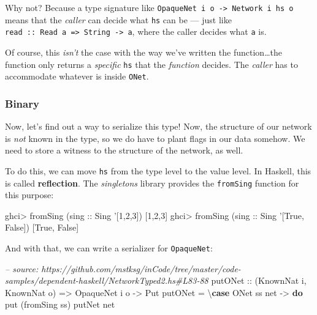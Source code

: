 \documentclass[]{article}
\newenvironment{Shaded}{}{}
\newcommand{\KeywordTok}[1]{\textcolor[rgb]{0.00,0.44,0.13}{\textbf{{#1}}}}
\newcommand{\DataTypeTok}[1]{\textcolor[rgb]{0.56,0.13,0.00}{{#1}}}
\newcommand{\DecValTok}[1]{\textcolor[rgb]{0.25,0.63,0.44}{{#1}}}
\newcommand{\CharTok}[1]{\textcolor[rgb]{0.25,0.44,0.63}{{#1}}}
\newcommand{\CommentTok}[1]{\textcolor[rgb]{0.38,0.63,0.69}{\textit{{#1}}}}
\newcommand{\OtherTok}[1]{\textcolor[rgb]{0.00,0.44,0.13}{{#1}}}
\newcommand{\FunctionTok}[1]{\textcolor[rgb]{0.02,0.16,0.49}{{#1}}}
\newcommand{\NormalTok}[1]{{#1}}
\begin{document}
Why not? Because a type signature like
\texttt{OpaqueNet\ i\ o\ -\textgreater{}\ Network\ i\ hs\ o} means that the
\emph{caller} can decide what \texttt{hs} can be --- just like
\texttt{read\ ::\ Read\ a\ =\textgreater{}\ String\ -\textgreater{}\ a}, where
the caller decides what \texttt{a} is.

Of course, this \emph{isn't} the case with the way we've written the
function\ldots{}the function only returns a \emph{specific} \texttt{hs} that the
\emph{function} decides. The \emph{caller} has to accommodate whatever is inside
\texttt{ONet}.

\subsubsection{Binary}\label{binary}

Now, let's find out a way to serialize this type! Now, the structure of our
network is \emph{not} known in the type, so we do have to plant flags in our
data somehow. We need to store a witness to the structure of the network, as
well.

To do this, we can move \texttt{hs} from the type level to the value level. In
Haskell, this is called \textbf{reflection}. The \emph{singletons} library
provides the \texttt{fromSing} function for this purpose:

\begin{Shaded}
\begin{Highlighting}[]
\NormalTok{ghci}\FunctionTok{>} \NormalTok{fromSing (}\OtherTok{sing ::} \DataTypeTok{Sing} \CharTok{'[1,2,3])}
\NormalTok{[}\DecValTok{1}\NormalTok{,}\DecValTok{2}\NormalTok{,}\DecValTok{3}\NormalTok{]}
\NormalTok{ghci}\FunctionTok{>} \NormalTok{fromSing (}\OtherTok{sing ::} \DataTypeTok{Sing} \CharTok{'[True, False])}
\NormalTok{[}\DataTypeTok{True}\NormalTok{, }\DataTypeTok{False}\NormalTok{]}
\end{Highlighting}
\end{Shaded}

And with that, we can write a serializer for \texttt{OpaqueNet}:

\begin{Shaded}
\begin{Highlighting}[]
\CommentTok{-- source: https://github.com/mstksg/inCode/tree/master/code-samples/dependent-haskell/NetworkTyped2.hs#L83-88}
\OtherTok{putONet ::} \NormalTok{(}\DataTypeTok{KnownNat} \NormalTok{i, }\DataTypeTok{KnownNat} \NormalTok{o)}
        \OtherTok{=>} \DataTypeTok{OpaqueNet} \NormalTok{i o}
        \OtherTok{->} \DataTypeTok{Put}
\NormalTok{putONet }\FunctionTok{=} \NormalTok{\textbackslash{}}\KeywordTok{case} \DataTypeTok{ONet} \NormalTok{ss net }\OtherTok{->} \KeywordTok{do}
                  \NormalTok{put (fromSing ss)}
                  \NormalTok{putNet net}
\end{Highlighting}
\end{Shaded}
\end{document}
